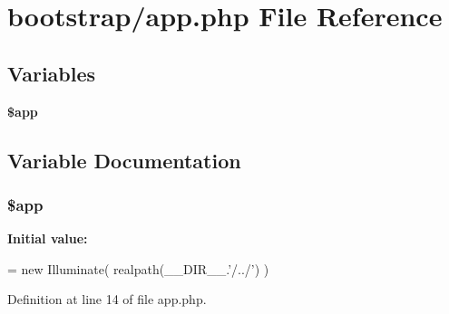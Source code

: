 \section{bootstrap/app.php File Reference}
\label{bootstrap_2app_8php}
\subsection*{Variables}
\begin{DoxyCompactItemize}
\item 
{\bf \$app}
\end{DoxyCompactItemize}


\subsection{Variable Documentation}
\subsubsection[{\$app}]{ \$app}\label{bootstrap_2app_8php_a62522999959415eece8538d7b01e7ae0}
{\bfseries Initial value\+:}
\begin{DoxyCode}
= \textcolor{keyword}{new} Illuminate\Foundation\Application(
    realpath(\_\_DIR\_\_.\textcolor{stringliteral}{'/../'})
)
\end{DoxyCode}


Definition at line 14 of file app.\+php.

